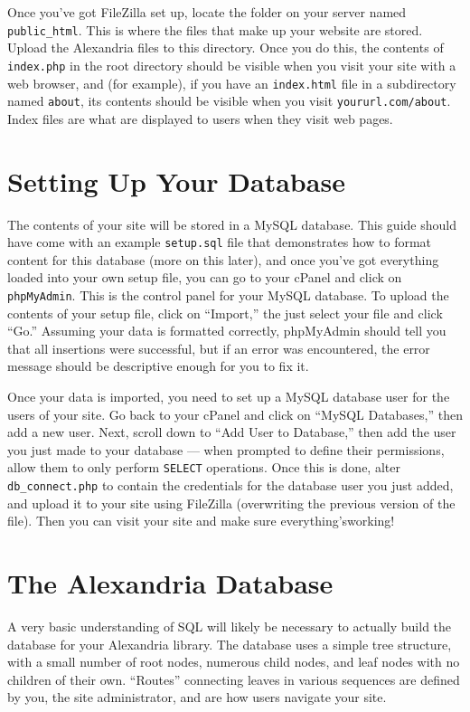 \documentclass[11pt]{article} %
\begin{document}
Once you’ve got FileZilla set up, locate the folder on your server named \texttt{public\_html}. This is where the files that make up your website are stored. Upload the Alexandria files to this directory. Once you do this, the contents of \texttt{index.php} in the root directory should be visible when you visit your site with a web browser, and (for example), if you have an \texttt{index.html} file in a subdirectory named \texttt{about}, its contents should be visible when you visit \texttt{yoururl.com/about}. Index files are what are displayed to users when they visit web pages.

\section{Setting Up Your Database}

The contents of your site will be stored in a MySQL database. This guide should have come with an example \texttt{setup.sql} file that demonstrates how to format content for this database (more on this later), and once you’ve got everything loaded into your own setup file, you can go to your cPanel and click on \texttt{phpMyAdmin}. This is the control panel for your MySQL database. To upload the contents of your setup file, click on “Import,” the just select your file and click “Go.” Assuming your data is formatted correctly, phpMyAdmin should tell you that all insertions were successful, but if an error was encountered, the error message should be descriptive enough for you to fix it.

Once your data is imported, you need to set up a MySQL database user for the users of your site. Go back to your cPanel and click on “MySQL Databases,” then add a new user. Next, scroll down to “Add User to Database,” then add the user you just made to
your database — when prompted to define their permissions, allow them to only perform \texttt{SELECT} operations. Once this is done, alter \texttt{db\_connect.php} to contain the credentials for the database user you just added, and upload it to your site using FileZilla (overwriting the previous version of the file). Then you can visit your site and make sure everything’sworking!

\section{The Alexandria Database}

A very basic understanding of SQL will likely be necessary to actually build the database for your Alexandria library. The database uses a simple tree structure, with a small number of root nodes, numerous child nodes, and leaf nodes with no children of their own. “Routes” connecting leaves in various sequences are defined by you, the site administrator, and are how users navigate your site.
\end{document}

